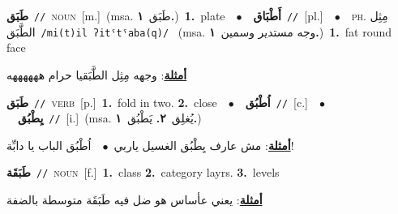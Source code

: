 \documentclass[10pt,a4paper,twoside]{article} %
\begin{document}
\begin{multicols}{2}
{\setlength\topsep{0pt}\textbf{\foreignlanguage{arabic}{طَبَق}}\ {\color{gray}\texttt{//}\color{black}}\ \textsc{noun}\ [m.]\ \color{gray}(msa. \foreignlanguage{arabic}{طَبَق}~\foreignlanguage{arabic}{\textbf{١.}})\color{black}\ \textbf{1.}~plate\ \ $\bullet$\ \ \setlength\topsep{0pt}\textbf{\foreignlanguage{arabic}{أَطْبَاق}}\ {\color{gray}\texttt{//}\color{black}}\ [pl.]\ \ $\bullet$\ \ \textsc{ph.} \color{gray} \foreignlanguage{arabic}{مِثِل الطَّبَق}\color{black}\ {\color{gray}\texttt{/{\sffamily mi(t)il ʔitˤtˤaba(q)}/}\color{black}}\ \color{gray} (msa. \foreignlanguage{arabic}{وجه مستدير وسمين}~\foreignlanguage{arabic}{\textbf{١.}})\color{black}\ \textbf{1.}~fat round face\  \begin{flushright}\color{gray}\foreignlanguage{arabic}{\textbf{\underline{\foreignlanguage{arabic}{أمثلة}}}: وجهه مِثِل الطَّبَقيا حرام ههههههه}\end{flushright}\color{black}} \vspace{2mm}

{\setlength\topsep{0pt}\textbf{\foreignlanguage{arabic}{طَبَق}}\ {\color{gray}\texttt{//}\color{black}}\ \textsc{verb}\ [p.]\ \textbf{1.}~fold in two.  \textbf{2.}~close\ \ $\bullet$\ \ \setlength\topsep{0pt}\textbf{\foreignlanguage{arabic}{اُطْبُق}}\ {\color{gray}\texttt{//}\color{black}}\ [c.]\ \ $\bullet$\ \ \setlength\topsep{0pt}\textbf{\foreignlanguage{arabic}{يِطْبُق}}\ {\color{gray}\texttt{//}\color{black}}\ [i.]\ \color{gray}(msa. \foreignlanguage{arabic}{يُغلِق}~\foreignlanguage{arabic}{\textbf{٢.}}  \foreignlanguage{arabic}{يَطْبُق}~\foreignlanguage{arabic}{\textbf{١.}})\color{black}\  \begin{flushright}\color{gray}\foreignlanguage{arabic}{\textbf{\underline{\foreignlanguage{arabic}{أمثلة}}}: مش عارف يِطْبُق الغسيل ياربي\ $\bullet$\ \  اُطْبُق الباب يا دابِّة!}\end{flushright}\color{black}} \vspace{2mm}

{\setlength\topsep{0pt}\textbf{\foreignlanguage{arabic}{طَبَقَة}}\ {\color{gray}\texttt{//}\color{black}}\ \textsc{noun}\ [f.]\ \textbf{1.}~class  \textbf{2.}~category layrs.  \textbf{3.}~levels\  \begin{flushright}\color{gray}\foreignlanguage{arabic}{\textbf{\underline{\foreignlanguage{arabic}{أمثلة}}}: يعني عأساس هو ضل فيه طَبَقَة متوسطة بالضفة}\end{flushright}\color{black}} \vspace{2mm}


\end{multicols}
\end{document}
